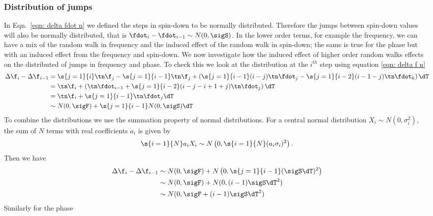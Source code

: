 \subsubsection{Distribution of jumps}
In Eqn.~\eqref{eqn: delta fdot n}  we defined the steps in spin-down to be
normally distributed. Therefore the jumps between spin-down values will also be
normally distributed, that is $\fdot_{i} - \fdot_{i-1} \sim N(0, \sigS)$. In
the lower order terms, for example the frequency, we can have a mix of the
random walk in frequency and the induced effect of the random walk in spin-down;
the same is true for the phase but with an induced effect from the frequency
and spin-down.  We now investigate how the induced effect of higher order random
walks effects on the distributed of jumps in frequency and phase. To check this
we  look at the distribution at the $i^{th}$ step using equation 
\eqref{eqn: delta f n}
\begin{align}
\Delta \f_{i} - \Delta \f_{i-1} & = \s{j=1}{i}\tn \f_{j}
-  \s{j=1}{i-1}\tn \f_{j} + \left(\s{j=1}{i-1}(i-j)\tn \fdot_{j}  
-  \s{j=1}{i-2}(i-1-j)\tn \fdot_{k} \right)\dT  \\
& = \tn \f_{i} + \left(\tn \fdot_{i-1} 
+ \s{j=1}{i-2}(i-j-i+1+j)\tn \fdot_{j}\right)\dT \\
& = \tn \f_{i} + \s{j=1}{i-1}\tn \fdot_{j} \dT \\
& \sim N(0, \sigF) + \s{j=1}{i-1}N(0, \sigS) \dT 
\end{align}
To combine the distributions we use the summation property of normal
distributions. For a central normal distribution $X_{i}\sim N(0,
\sigma_{i}^{2})$, the sum of $N$ terms with real coefficients $a_{i}$ is given
by 
\begin{equation}
\s{i=1}{N}a_{i}X_{i} \sim N\left(0, \s{i=1}{N}(a_{i}\sigma_{i})^{2}\right).
\end{equation}
Then we have
\begin{align}
\Delta \f_{i} - \Delta \f_{i-1} & \sim N(0, \sigF) 
+ N\left(0, \s{j=1}{i-1}(\sigS\dT)^{2}\right) \\
& \sim N(0, \sigF) + N(0, (i-1)\sigS\dT^{2}) \\
& \sim N(0, \sigF + (i-1)\sigS\dT^2)  
\end{align}
Similarly for the phase 
